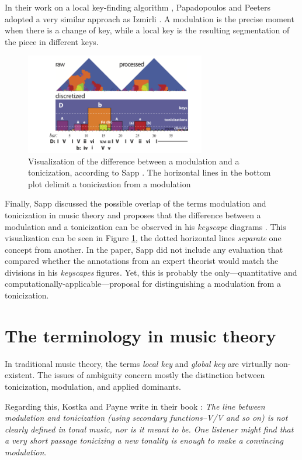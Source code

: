 In their work on a local key-finding algorithm \cite{papadopoulos2009local}, Papadopoulos and Peeters adopted a very similar approach as Izmirli \cite{izmirli2007localized}. A modulation is the precise moment when there is a change of key, while a local key is the resulting segmentation of the piece in different keys.

\begin{figure}[h]
    \centering
    \includegraphics[width=0.7\textwidth]{figures/Q5_1.png}
    \caption{Visualization of the difference between a modulation and a tonicization, according to Sapp \cite{sapp2011computational}. The horizontal lines in the bottom plot delimit a tonicization from a modulation}
    \label{fig:Q5_1}
\end{figure}

Finally, Sapp discussed the possible overlap of the terms modulation and tonicization in music theory and proposes that the difference between a modulation and a tonicization can be observed in his \emph{keyscape} diagrams \cite{sapp2011computational}. This visualization can be seen in Figure \ref{fig:Q5_1}, the dotted horizontal lines \emph{separate} one concept from another. In the paper, Sapp did not include any evaluation that compared whether the annotations from an expert theorist would match the divisions in his \emph{keyscapes} figures. Yet, this is probably the only---quantitative and computationally-applicable---proposal for distinguishing a modulation from a tonicization.


\section{The terminology in music theory}

In traditional music theory, the terms \emph{local key} and \emph{global key} are virtually non-existent. The issues of ambiguity concern mostly the distinction between tonicization, modulation, and applied dominants.

Regarding this, Kostka and Payne write in their book \cite{kostka2018tonal}: \emph{The line between modulation and tonicization (using secondary functions--V/V and so on) is not clearly defined in tonal music, nor is it meant to be. One listener might find that a very short passage tonicizing a new tonality is enough to make a convincing modulation}.

